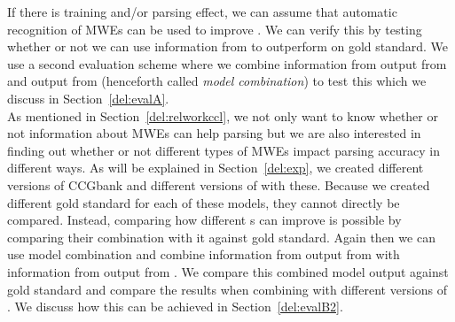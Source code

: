 \documentclass[output=paper]{langsci/langscibook}
\begin{document}
    \indent If there is training and/or parsing effect, we can assume that automatic recognition of MWEs can be used to improve . We can verify this by testing whether or not we can use information from {\modelB} to outperform {\modelA} on gold standard. We use a second evaluation scheme where we combine information from output from {\modelA} and output from {\modelB} (henceforth called \textit{model combination}) to test this which we discuss in Section~\ref{del:evalA}. \\
    \indent As mentioned in Section~\ref{del:relworkccl}, we not only want to know whether or not information about MWEs can help  parsing but we are also interested in finding out whether or not different types of MWEs impact parsing accuracy in different ways. As will be explained in Section~\ref{del:exp}, we created different versions of CCGbank and different versions of {\modelB} with these. Because we created different gold standard for each of these models, they cannot directly be compared. Instead, comparing how different {\modelB} s can improve {\modelA} is possible by comparing their combination with it against gold standard. Again then we can use model combination and combine information from output from {\modelA} with information from output from {\modelB}. We compare this combined model output against gold standard and compare the results when combining {\modelA} with different versions of {\modelB}. We discuss how this can be achieved in Section~\ref{del:evalB2}. 
\end{document}
